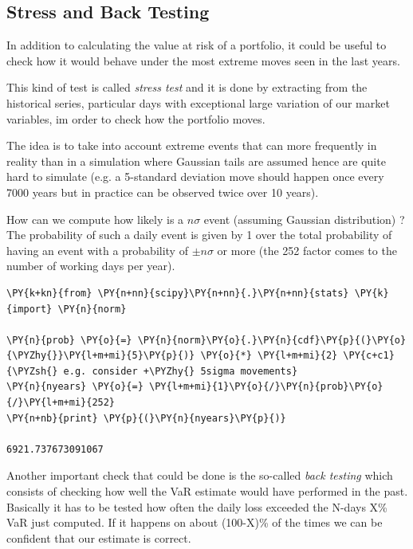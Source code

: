 \subsection{Stress and Back Testing}\label{stress-testing-and-back-testing}

In addition to calculating the value at risk of a portfolio, it could be useful to 
check how it would behave under the most extreme moves seen in the last years.

This kind of test is called \emph{stress test} and it is done by extracting from the historical series, particular days with exceptional large variation of our market variables, im order to check
how the portfolio moves.
 
The idea is to take into account extreme events that can more frequently in reality 
than in a simulation where Gaussian tails are assumed hence are quite hard to simulate
(e.g. a 5-standard deviation move should happen once every 7000 years
but in practice can be observed twice over 10 years).

How can we compute how likely is a $n\sigma$ event (assuming Gaussian distribution) ?
The probability of such a daily event is given by 1 over the total probability of having an 
event with a probability of $\pm n\sigma$ or more (the 252 factor comes to the number of working days per year).

\begin{tcolorbox}[breakable, size=fbox, boxrule=1pt, pad at break*=1mm,colback=cellbackground, colframe=cellborder]
\begin{Verbatim}[commandchars=\\\{\}]
\PY{k+kn}{from} \PY{n+nn}{scipy}\PY{n+nn}{.}\PY{n+nn}{stats} \PY{k}{import} \PY{n}{norm}

\PY{n}{prob} \PY{o}{=} \PY{n}{norm}\PY{o}{.}\PY{n}{cdf}\PY{p}{(}\PY{o}{\PYZhy{}}\PY{l+m+mi}{5}\PY{p}{)} \PY{o}{*} \PY{l+m+mi}{2} \PY{c+c1}{\PYZsh{} e.g. consider +\PYZhy{} 5sigma movements}
\PY{n}{nyears} \PY{o}{=} \PY{l+m+mi}{1}\PY{o}{/}\PY{n}{prob}\PY{o}{/}\PY{l+m+mi}{252}
\PY{n+nb}{print} \PY{p}{(}\PY{n}{nyears}\PY{p}{)}

6921.737673091067
    \end{Verbatim}
\end{tcolorbox}

Another important check that could be done is the so-called \emph{back testing}
which consists of checking how well the VaR estimate would have
performed in the past. Basically it has to be tested how often the daily
loss exceeded the N-days X\% VaR just computed. If it happens on about
(100-X)\% of the times we can be confident that our estimate is correct.

